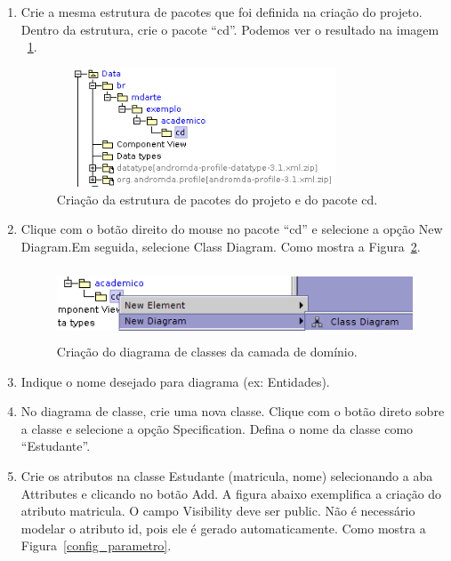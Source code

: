 \begin{enumerate}
\item Crie a mesma estrutura de pacotes que foi definida na criação do projeto.
Dentro da estrutura, crie o pacote “cd”. Podemos ver o resultado na imagem
~\ref{cria_estrutura_pacotes}. 
\begin{figure}[!htb]
	\centering
	\includegraphics[width=250pt,height=100pt]{imgs/tutorial-mdarte-0000.png}
	\caption{Criação da estrutura de pacotes do projeto e do pacote cd.}
	\label{cria_estrutura_pacotes}
\end{figure}
\item Clique com o botão direito do mouse no pacote “cd” e selecione a opção New
Diagram.Em seguida, selecione Class Diagram. Como mostra a
Figura~\ref{cria_diagrama_classe}.
\begin{figure}[!htb]
	\centering
	\includegraphics[width=400pt,height=60pt]{imgs/tutorial-mdarte-0001.png}
	\caption{Criação do diagrama de classes da camada de domínio.}
	\label{cria_diagrama_classe}
\end{figure}
	
\item Indique o nome desejado para diagrama (ex: Entidades).
	
\item No diagrama de classe, crie uma nova classe. Clique com o botão direto sobre a classe e selecione a opção Specification. Defina o nome da classe como “Estudante”.
	
\item Crie os atributos na classe Estudante (matricula, nome) selecionando a aba Attributes e clicando no botão Add. A figura abaixo exemplifica a criação do atributo matricula. O campo Visibility deve ser public. Não é necessário modelar o atributo id, pois ele é gerado automaticamente. Como mostra a Figura~\ref{config_parametro}.


\end{enumerate}
